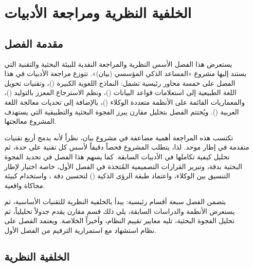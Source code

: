 \chapter{الخلفية النظرية ومراجعة الأدبيات}
\label{ch:literature}

\section{مقدمة الفصل}
\label{sec:lit-intro}

يستعرض هذا الفصل الأسس النظرية والمراجعة النقدية للبيئة البحثية والتقنية التي
يستند إليها مشروع «المساعد الذكي المؤسسي (بيان)». تتوزع مراجعة الأدبيات في
هذا الفصل على خمسة محاور رئيسية تشمل: النماذج اللغوية الكبيرة ()،
وتقنيات تحويل اللغة الطبيعية إلى استعلامات قواعد البيانات ()،
ونظم الاسترجاع المعزز بالتوليد ()، والمعماريات القائمة على الأنظمة
متعددة الوكلاء ()، بالإضافة إلى تحديات معالجة اللغة
العربية (). ويُختتم الفصل بتحليل مقارن يبرز الفجوة البحثية
والتطبيقية التي يستهدف المشروع معالجتها.

تكتسب هذه المراجعة أهمية مضاعفة في مشروع بيان، نظراً لأنه يدمج أربع تقنيات
متقدمة في إطار موحد. لذا، يتطلب المشروع فحصاً دقيقاً لأسس كل تقنية على حدة،
ثم تحليل كيفية تكاملها في الأدبيات السابقة. كما يسهم هذا الفصل في تحديد الفجوة
البحثية بدقة، وتبرير القرارات التصميمية المُتخذة في الفصل الأول، خاصة اختيار
 لإطار التنسيق بين الوكلاء، واعتماد طبقة الرؤى الذكية ()
لتحسين دقة ، واستخدام  كبيئة محاكاة واقعية.

يتضمن الفصل سبعة أقسام رئيسية: يبدأ بالخلفية النظرية للتقنيات الأساسية، ثم
يستعرض الأنظمة والدراسات السابقة، يلي ذلك قسم مقارن يقدم جدولاً تحليلياً، ثم
تحليل الفجوة البحثية، تليه معايير تقييم النظام، وأخيراً الخلاصة. ويعتمد الفصل على نظام استشهاد 
مع استمرارية الترقيم من الفصل الأول.

\section{الخلفية النظرية}
\label{sec:theory}

